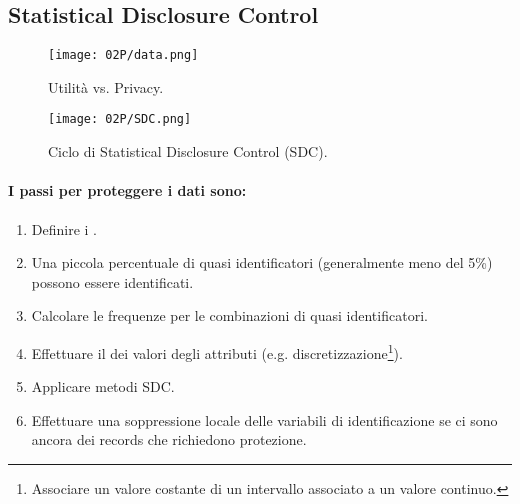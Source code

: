 
\subsection{Statistical Disclosure Control}



\begin{figure}[h]
    \centering
    \texttt{[image: 02P/data.png]}
    \caption{Utilità vs. Privacy.}
    \label{fig:data}

\end{figure}

\begin{figure}[h]
    \centering
    \texttt{[image: 02P/SDC.png]}
    \caption{Ciclo di Statistical Disclosure Control (SDC).}
\end{figure}

\paragraph{I passi per proteggere i dati sono:}

\begin{enumerate}
  \item Definire i . 
  \item Una piccola percentuale di quasi identificatori (generalmente meno del 5\%) possono essere identificati.
  \item Calcolare le frequenze per le combinazioni di quasi identificatori. 
  \item Effettuare il  dei valori degli attributi (e.g. discretizzazione\footnote{Associare un valore costante di un intervallo associato a un valore continuo.}). 
  \item Applicare metodi SDC. 
  \item Effettuare una soppressione locale delle variabili di identificazione se ci sono ancora dei records che richiedono protezione.
\end{enumerate}

